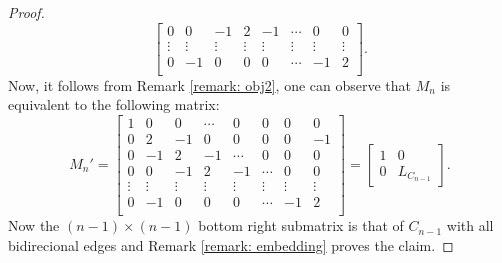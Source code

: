 \documentclass[11pt,reqno]{amsart}
\theoremstyle{definition}
\theoremstyle{plain}
\begin{document}
\begin{proof}
\[\begin{bmatrix}
	0 & 0 & -1 & 2 & -1 & \cdots & 0 & 0  \\
\vdots & \vdots & \vdots & \vdots & \vdots & \vdots & \vdots& \vdots  \\
	0 & -1 & 0 & 0 & 0 & \cdots & -1 & 2 \\
\end{bmatrix}. 
\]
Now, it follows from Remark \ref{remark: obj2}, one can observe that $M_n$ is equivalent to the following matrix:
\[
M_n'=\begin{bmatrix}
	1 & 0 & 0 & \cdots & 0 & 0 & 0 & 0 \\
	0 & 2 & -1 & 0 & 0 & 0 & 0 & -1   \\
	0 & -1 & 2 & -1 & \cdots & 0 & 0 & 0 \\
	0 & 0 & -1 & 2 & -1 & \cdots & 0 & 0  \\
	\vdots & \vdots & \vdots & \vdots & \vdots & \vdots & \vdots& \vdots  \\
	0 & -1 & 0 & 0 & 0 & \cdots & -1 & 2 \\
\end{bmatrix} = \left[ \begin{array}{c|c}
1 & 0 \\
\hline
0 &L_{C_{n-1}}
\end{array} \right].
\]
Now the $(n-1) \times (n-1)$ bottom right submatrix is that of $C_{n-1}$ with all bidirecional edges and Remark \ref{remark: embedding} proves the claim.


\end{proof}
\end{document}
